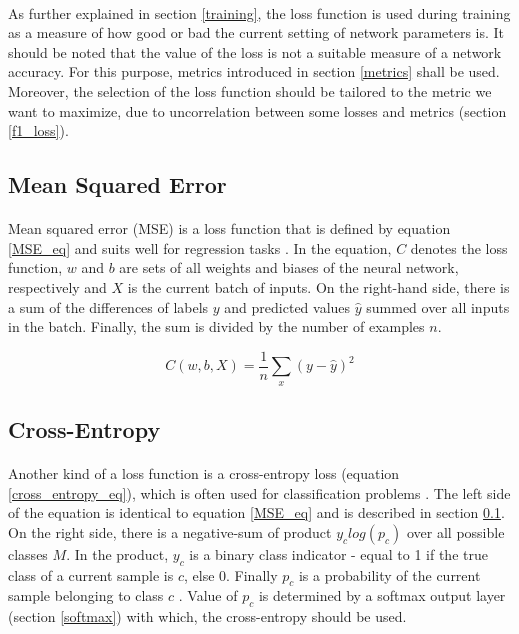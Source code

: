 \paragraph{}
As further explained in section \ref{training}, the loss function is used during training as a measure of how good or bad the current setting of network parameters is. It should be noted that the value of the loss is not a suitable measure of a network accuracy. For this purpose, metrics introduced in section \ref{metrics} shall be used. Moreover, the selection of the loss function should be tailored to the metric we want to maximize, due to uncorrelation between some losses and metrics (section \ref{f1_loss}).

\subsection{Mean Squared Error}\label{MSE}
\paragraph{}
Mean squared error (MSE) is a loss function that is defined by equation \ref{MSE_eq} and suits well for regression tasks \cite{deep_learning_with_python}. In the equation, $C$ denotes the loss function, $w$ and $b$ are sets of all weights and biases of the neural network, respectively and $X$ is the current batch of inputs. On the right-hand side, there is a sum of the differences of labels $y$ and predicted values $\hat{y}$ summed over all inputs in the batch. Finally, the sum is divided by the number of examples $n$.

\begin{equation}
C(w, b, X) = \frac{1}{n}\sum_{x}^{} (y - \hat{y})^2
\label{MSE_eq}
\end{equation} 

\subsection{Cross-Entropy}\label{cross_entropy}
\paragraph{}
Another kind of a loss function is a cross-entropy loss (equation \ref{cross_entropy_eq}), which is often used for classification problems \cite{deep_learning_with_python}. The left side of the equation is identical to equation \ref{MSE_eq} and is described in section \ref{MSE}. On the right side, there is a negative-sum of product $y_{c}log(p_{c})$ over all possible classes $M$. In the product, $y_{c}$ is a binary class indicator - equal to 1 if the true class of a current sample is $c$, else 0. Finally $p_{c}$ is a probability of the current sample belonging to class $c$ \cite{cross_entropy}. Value of $p_{c}$ is determined by a softmax output layer (section \ref{softmax}) with which, the cross-entropy should be used.

